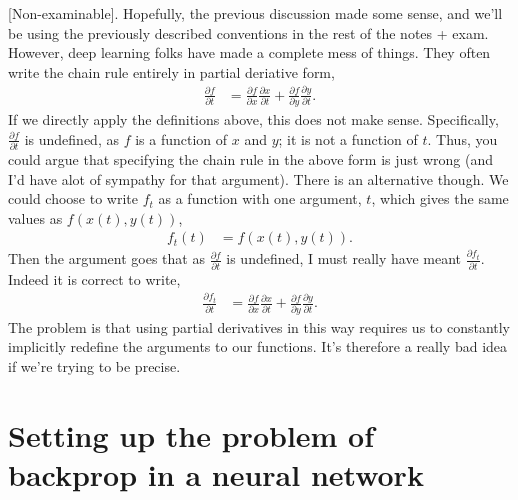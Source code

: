 \documentclass{article}
\newcommand{\dd}[2][]{\frac{\partial #1}{\partial #2}}
\begin{document}
[Non-examinable]. 
Hopefully, the previous discussion made some sense, and we'll be using the previously described conventions in the rest of the notes + exam.
However, deep learning folks have made a complete mess of things.
They often write the chain rule entirely in partial deriative form,
\begin{align}
  \dd[f]{t} &= \dd[f]{x} \dd[x]{t} + \dd[f]{y} \dd[y]{t}.
\end{align}
If we directly apply the definitions above, this does not make sense. 
Specifically, $\dd[f]{t}$ is undefined, as $f$ is a function of $x$ and $y$; it is not a function of $t$.
Thus, you could argue that specifying the chain rule in the above form is just wrong (and I'd have alot of sympathy for that argument).
There is an alternative though. 
We could choose to write $f_t$ as a function with one argument, $t$, which gives the same values as $f(x(t), y(t))$,
\begin{align}
  f_t(t) &= f(x(t), y(t)).
\end{align}
Then the argument goes that as $\dd[f]{t}$ is undefined, I must really have meant $\dd[f_t]{t}$.
Indeed it is correct to write,
\begin{align}
  \dd[f_t]{t} &= \dd[f]{x} \dd[x]{t} + \dd[f]{y} \dd[y]{t}.
\end{align}
The problem is that using partial derivatives in this way requires us to constantly implicitly redefine the arguments to our functions. 
It's therefore a really bad idea if we're trying to be precise.


\section{Setting up the problem of backprop in a neural network}
\end{document}
